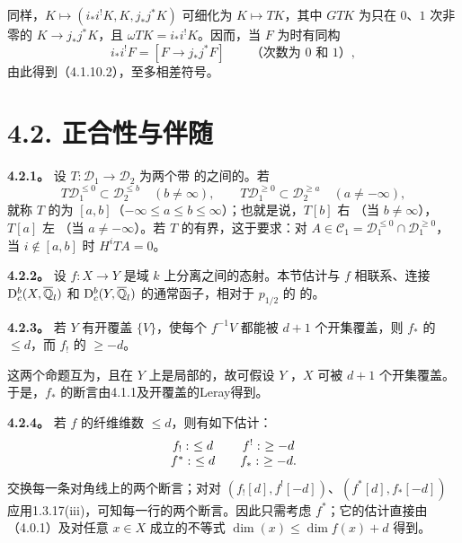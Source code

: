 同样，$K\mapsto(i_*i^!K,K,j_*j^*K)$ 可细化为 $K\mapsto TK$，其中 $GTK$ 为只在 $0$、$1$ 次非零的 $K\to j_*j^*K$，且 $\omega TK=i_*i^!K$。因而，当 $F$ 为时有同构
\[i_*i^!F=[F\longrightarrow j_*j^*F]\qquad\text{（次数为 $0$ 和 $1$）},\]
由此得到（4.1.10.2），至多相差符号。

\section*{4.2. 正合性与伴随}
\par\medskip\noindent\textbf{4.2.1。} 设 $T:\mathscr D_1\to\mathscr D_2$ 为两个带 的之间的。若
\[T\mathscr D_1^{\le0}\subset\mathscr D_2^{\le b}\quad(b\ne\infty),\qquad T\mathscr D_1^{\ge0}\subset\mathscr D_2^{\ge a}\quad(a\ne-\infty),\]
就称 $T$ 的为 $[a,b]$（$-\infty\le a\le b\le\infty$）；也就是说，$T[b]$ 右 （当 $b\ne\infty$），$T[a]$ 左 （当 $a\ne-\infty$）。若 $T$ 的有界，这于要求：对 $A\in\mathscr C_1=\mathscr D_1^{\le0}\cap\mathscr D_1^{\ge0}$，当 $i\notin[a,b]$ 时 $H^iTA=0$。

\par\medskip\noindent\textbf{4.2.2。} 设 $f:X\to Y$ 是域 $k$ 上分离之间的态射。本节估计与 $f$ 相联系、连接 $\mathrm{D}_c^b(X,\overline{\mathbb Q}_l)$ 和 $\mathrm{D}_c^b(Y,\overline{\mathbb Q}_l)$ 的通常函子，相对于 $p_{1/2}$ 的 的。

\par\medskip\noindent\textbf{4.2.3。} 若 $Y$ 有开覆盖 $\{V\}$，使每个 $f^{-1}V$ 都能被 $d+1$ 个开集覆盖，则 $f_*$ 的 $\le d$，而 $f_!$ 的 $\ge-d$。

这两个命题互为，且在 $Y$ 上是局部的，故可假设 $Y$ ，$X$ 可被 $d+1$ 个开集覆盖。于是，$f_*$ 的断言由4.1.1及开覆盖的Leray得到。

\par\medskip\noindent\textbf{4.2.4。} 若 $f$ 的纤维维数 $\le d$，则有如下估计：
\[\begin{array}{c@{\qquad}c}f_!:\ \le d&f^!:\ \ge-d\\f^*:\ \le d&f_*:\ \ge-d.\end{array}\]
交换每一条对角线上的两个断言；对对 $(f_![d],\allowbreak f^![-d])$、$(f^*[d],\allowbreak f_*[-d])$ 应用1.3.17(iii)，可知每一行的两个断言。因此只需考虑 $f^*$；它的估计直接由（4.0.1）及对任意 $x\in X$ 成立的不等式 $\dim(x)\le\dim f(x)+d$ 得到。

